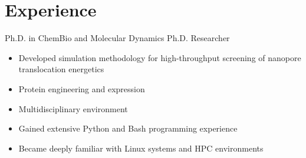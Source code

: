 \documentclass[letterpaper]{twentysecondcv} %
\begin{document}

\section{Experience}

\begin{twenty} %
		{Ph.D. {\normalfont in ChemBio and Molecular Dynamics}}
		{Ph.D. Researcher}
		{\begin{itemize}
			\item Developed simulation methodology for high-throughput screening of nanopore translocation energetics
			\item Protein engineering and expression
			\item Multidisciplinary environment
			\item Gained extensive Python and Bash programming experience
			\item Became deeply familiar with Linux systems and HPC environments
		\end{itemize}}
		

\end{twenty}
\end{document}
